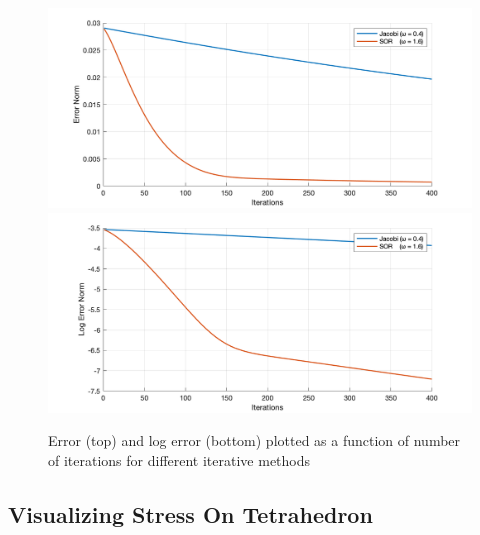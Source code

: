 \documentclass[11pt,titlepage]{article}
\begin{document}
\begin{figure}[!htbp]
    \begin{center}
        \includegraphics[width=\textwidth]{archbridge_tiny_errornorm.png}
        \includegraphics[width=\textwidth]{archbridge_tiny_logerrornorm.png}
        \caption{\label{fig:3} Error (top) and log error (bottom) plotted as a function of number of iterations for different iterative methods}
    \end{center}
\end{figure}

\subsection{Visualizing Stress On Tetrahedron}
\end{document}
